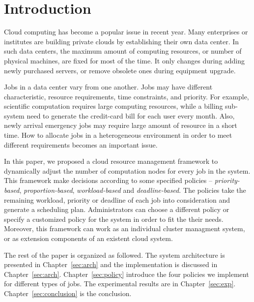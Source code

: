\chapter{Introduction}\label{sec:intro}

Cloud computing has become a popular issue in recent year.
Many enterprises or institutes are building private clouds by 
establishing their own data center.
In such data centers, the maximum amount of computing resources, or 
number of physical machines, are fixed for most of the time.
It only changes during adding newly purchased servers, or remove 
obsolete ones during equipment upgrade.


Jobs in a data center vary from one another.
Jobs may have different characteristic, resource requirements, time 
constraints, and priority.
For example, scientific computation requires large computing resources,
while a billing sub-system need to generate the credit-card bill for 
each user every month.
Also, newly arrival emergency jobs may require large amount of resource
in a short time.
How to allocate jobs in a heterogeneous environment in order to meet 
different requirements becomes an important issue.

In this paper, we proposed a cloud resource management framework to 
dynamically adjust the number of computation nodes for every job in the
system.
This framework make decisions according to some specified policies --
\emph{priority-based}, \emph{proportion-based}, \emph{workload-based}
and \emph{deadline-based}.
The policies take the remaining workload, priority or deadline of each
job into consideration and generate a scheduling plan.
Administrators can choose a different policy or specify a customized
policy for the system in order to fit the their needs.
Moreover, this framework can work as an individual cluster managment
system, or as extension components of an existent cloud system.

The rest of the paper is organized as followed.
The system architecture is presented in Chapter~\ref{sec:arch} and the
implementation is discussed in Chapter~\ref{sec:arch}.
Chapter~\ref{sec:policy} introduce the four policies we implement for 
different types of jobs.
The experimental results are in Chapter~\ref{sec:exp}.
Chapter~\ref{sec:conclusion} is the conclusion.
